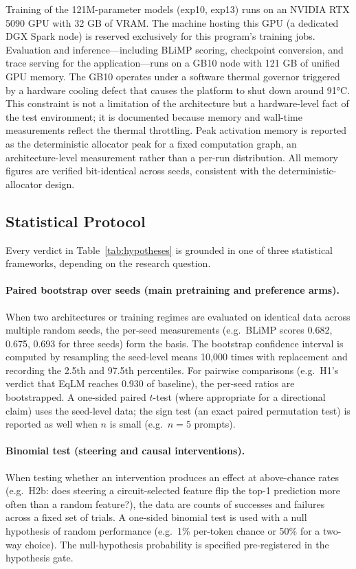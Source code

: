 Training of the 121M-parameter models (exp10, exp13) runs on an NVIDIA RTX 5090 GPU with 32 GB of VRAM. The machine
hosting this GPU (a dedicated DGX Spark node) is reserved exclusively for this program's training jobs. Evaluation and
inference—including BLiMP scoring, checkpoint conversion, and trace serving for the application—runs on a GB10 node
with 121 GB of unified GPU memory. The GB10 operates under a software thermal governor triggered by a hardware cooling
defect that causes the platform to shut down around 91°C. This constraint is not a limitation of the architecture but
a hardware-level fact of the test environment; it is documented because memory and wall-time measurements reflect the
thermal throttling. Peak activation memory is reported as the deterministic allocator peak for a fixed computation
graph, an architecture-level measurement rather than a per-run distribution. All memory figures are verified bit-identical
across seeds, consistent with the deterministic-allocator design.

\subsection{Statistical Protocol}

Every verdict in Table~\ref{tab:hypotheses} is grounded in one of three statistical frameworks, depending on the
research question.

\paragraph{Paired bootstrap over seeds (main pretraining and preference arms).} When two architectures or training
regimes are evaluated on identical data across multiple random seeds, the per-seed measurements (e.g.\ BLiMP scores
0.682, 0.675, 0.693 for three seeds) form the basis. The bootstrap confidence interval is computed by resampling the
seed-level means 10,000 times with replacement and recording the 2.5th and 97.5th percentiles. For pairwise comparisons
(e.g.\ H1's verdict that EqLM reaches 0.930 of baseline), the per-seed ratios are bootstrapped. A one-sided paired
$t$-test (where appropriate for a directional claim) uses the seed-level data; the sign test (an exact paired
permutation test) is reported as well when $n$ is small (e.g.\ $n = 5$ prompts).

\paragraph{Binomial test (steering and causal interventions).} When testing whether an intervention produces an effect
at above-chance rates (e.g.\ H2b: does steering a circuit-selected feature flip the top-1 prediction more often than
a random feature?), the data are counts of successes and failures across a fixed set of trials. A one-sided binomial
test is used with a null hypothesis of random performance (e.g.\ 1\% per-token chance or 50\% for a two-way choice).
The null-hypothesis probability is specified pre-registered in the hypothesis gate.

